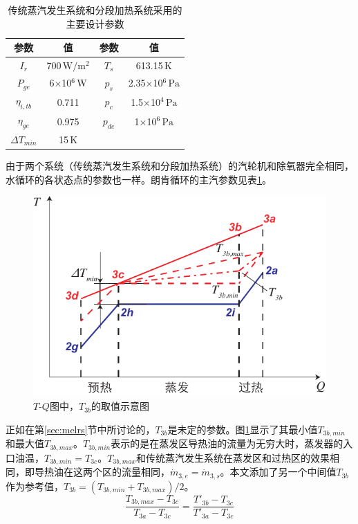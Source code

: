 \begin{table}[htbp]
\setlength{\abovecaptionskip}{-10pt}
	\caption{传统蒸汽发生系统和分段加热系统采用的主要设计参数}
	\begin{center}
	\begin{tabular}{cccc}
		\toprule
		参数		&	值	&	参数		&	值\\
		\midrule
		$I_r$	&	700$\,\mathrm{W/m^2}$	&	$T_s$		&	613.15$\,\mathrm{K}$\\
		$P_{ge}$	&	6$\times$10$^6\,\mathrm{W}$	&	$p_s$		&	2.35$\times$10$^6\,\mathrm{Pa}$\\
		$\eta_{i,tb}$	&	0.711	&	$p_c$		&	1.5$\times$10$^4\,\mathrm{Pa}$\\
		$\eta_{ge}$	&	0.975	&	$p_{de}$		&	1$\times$10$^6\,\mathrm{Pa}$\\
		$\Delta T_{min}$	&	15$\,\mathrm{K}$	&	&\\		
		\bottomrule
	\end{tabular}
	\end{center}
	\label{tab:ptc}
\end{table}

由于两个系统（传统蒸汽发生系统和分段加热系统）的汽轮机和除氧器完全相同，水循环的各状态点的参数也一样。朗肯循环的主汽参数见表\ref{tab:ptc}。

\noindent \begin{figure}[htbp]
\begin{center}
	\includegraphics[width = 0.7\columnwidth]{fig/T3b}
	\caption{$T$-$Q$图中，$T_{3b}$的取值示意图}
	\label{fig:T3b}
\end{center}
\end{figure}

正如在第\ref{sec:melrs}节中所讨论的，$T_{3b}$是未定的参数。图\ref{fig:T3b}显示了其最小值$T_{3b,min}$和最大值$T_{3b,max}$。$T_{3b,min}$表示的是在蒸发区导热油的流量为无穷大时，蒸发器的入口油温，$T_{3b,min} = T_{3c}$。$T_{3b,max}$和传统蒸汽发生系统在蒸发区和过热区的效果相同，即导热油在这两个区的流量相同，$\dot{m}_{3,e} = \dot{m}_{3,s}$。本文添加了另一个中间值$T_{3b}$作为参考值，$T_{3b} = (T_{3b,min} + T_{3b,max}) / 2$。
\begin{equation}
  \dfrac{T_{3b,max}-T_{3c}}{T_{3a} - T_{3c}} = \dfrac{T'_{3b} - T_{3c}}{T'_{3a} - T_{3c}}
\end{equation}

